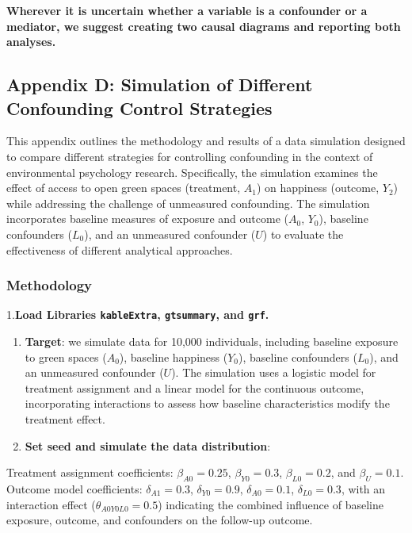 \documentclass[
  singlecolumn]{article}
\begin{document}
\textbf{Wherever it is uncertain whether a variable is a confounder or a
mediator, we suggest creating two causal diagrams and reporting both
analyses.}

\newpage{}

\subsection{Appendix D: Simulation of Different Confounding Control
Strategies}\label{appendix-d}

This appendix outlines the methodology and results of a data simulation
designed to compare different strategies for controlling confounding in
the context of environmental psychology research. Specifically, the
simulation examines the effect of access to open green spaces
(treatment, \(A_1\)) on happiness (outcome, \(Y_2\)) while addressing
the challenge of unmeasured confounding. The simulation incorporates
baseline measures of exposure and outcome (\(A_0\), \(Y_0\)), baseline
confounders (\(L_0\)), and an unmeasured confounder (\(U\)) to evaluate
the effectiveness of different analytical approaches.

\subsubsection{Methodology}\label{methodology-1}

1.\textbf{Load Libraries \texttt{kableExtra}, \texttt{gtsummary}, and
\texttt{grf}.}

\begin{enumerate}
\def\labelenumi{\arabic{enumi}.}
\item
  \textbf{Target}: we simulate data for 10,000 individuals, including
  baseline exposure to green spaces (\(A_0\)), baseline happiness
  (\(Y_0\)), baseline confounders (\(L_0\)), and an unmeasured
  confounder (\(U\)). The simulation uses a logistic model for treatment
  assignment and a linear model for the continuous outcome,
  incorporating interactions to assess how baseline characteristics
  modify the treatment effect.
\item
  \textbf{Set seed and simulate the data distribution}:
\end{enumerate}

Treatment assignment coefficients: \(\beta_{A0} = 0.25\),
\(\beta_{Y0} = 0.3\), \(\beta_{L0} = 0.2\), and \(\beta_{U} = 0.1\).
Outcome model coefficients: \(\delta_{A1} = 0.3\),
\(\delta_{Y0} = 0.9\), \(\delta_{A0} = 0.1\), \(\delta_{L0} = 0.3\),
with an interaction effect (\(\theta_{A0Y0L0} = 0.5\)) indicating the
combined influence of baseline exposure, outcome, and confounders on the
follow-up outcome.
\end{document}
